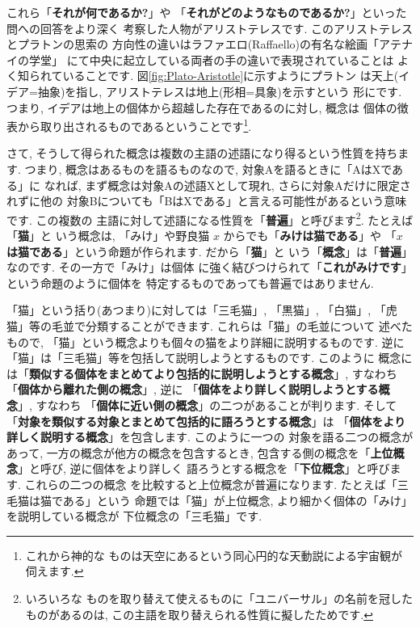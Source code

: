 これら「\textbf{それが何であるか?}」や
「\textbf{それがどのようなものであるか?}」といった問への回答をより深く
考察した人物がアリストテレスです. このアリストテレスとプラトンの思索の
方向性の違いはラファエロ(Raffaello)の有名な絵画「アテナイの学堂」
\cite{アテナイ}にて中央に起立している両者の手の違いで表現されていることは
よく知られていることです. 図\ref{fig:Plato-Aristotle}に示すようにプラトン
は天上(イデア=抽象)を指し, アリストテレスは地上(形相=具象)を示すという
形にです. つまり, イデアは地上の個体から超越した存在であるのに対し, 概念は
個体の徴表から取り出されるものであるということです\footnote{これから神的な
ものは天空にあるという同心円的な天動説による宇宙観が伺えます.}.
\newline

さて, そうして得られた概念は複数の主語の述語になり得るという性質を持ちます.
 つまり, 概念はあるものを語るものなので, 対象Aを語るときに「AはXである」に
なれば, まず概念は対象Aの述語Xとして現れ, さらに対象Aだけに限定されずに他の
対象Bについても「BはXである」と言える可能性があるという意味です. この複数の
主語に対して述語になる性質を「\textbf{普遍}」と呼びます\footnote{いろいろな
ものを取り替えて使えるものに「ユニバーサル」の名前を冠したものがあるのは,
 この主語を取り替えられる性質に擬したためです.}. たとえば「\textbf{猫}」と
いう概念は, 「みけ」や野良猫 $x$ からでも「\textbf{みけは猫である}」や
「\textbf{$x$ は猫である}」という命題が作られます. だから「\textbf{猫}」と
いう「\textbf{概念}」は「\textbf{普遍}」なのです. その一方で「みけ」は個体
に強く結びつけられて「\textbf{これがみけです}」という命題のように個体を
特定するものであっても普遍ではありません.
\newline

「猫」という括り(あつまり)に対しては「三毛猫」, 「黒猫」, 「白猫」,
 「虎猫」等の毛並で分類することができます. これらは「猫」の毛並について
述べたもので, 「猫」という概念よりも個々の猫をより詳細に説明するものです.
 逆に「猫」は「三毛猫」等を包括して説明しようとするものです. このように
概念には「\textbf{類似する個体をまとめてより包括的に説明しようとする概念}」,
 すなわち「\textbf{個体から離れた側の概念}」, 逆に
「\textbf{個体をより詳しく説明しようとする概念}」, すなわち
「\textbf{個体に近い側の概念}」の二つがあることが判ります. そして
「\textbf{対象を類似する対象とまとめて包括的に語ろうとする概念}」は
「\textbf{個体をより詳しく説明する概念}」を包含します. このように一つの
対象を語る二つの概念があって, 一方の概念が他方の概念を包含するとき,
 包含する側の概念を「\textbf{上位概念}」と呼び, 逆に個体をより詳しく
語ろうとする概念を「\textbf{下位概念}」と呼びます. これらの二つの概念
を比較すると上位概念が普遍になります. たとえば「三毛猫は猫である」という
命題では「猫」が上位概念, より細かく個体の「みけ」を説明している概念が
下位概念の「三毛猫」です.
\newline

